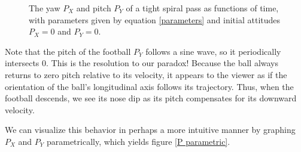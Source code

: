 \documentclass{article}
\begin{document}
\begin{figure}[h]
    \centering
    \caption{The yaw $P_X$ and pitch $P_Y$ of a tight spiral pass as functions of time, with parameters given by equation \ref{parameters} and initial attitudes $P_X = 0$ and $P_Y = 0$.}
    \label{P vs time}
\end{figure}
Note that the pitch of the football $P_Y$ follows a sine wave, so it periodically intersects $0$. This is the resolution to our paradox! Because the ball always returns to zero pitch relative to its velocity, it appears to the viewer as if the orientation of the ball's longitudinal axis follows its trajectory. Thus, when the football descends, we see its nose dip as its pitch compensates for its downward velocity.

We can visualize this behavior in perhaps a more intuitive manner by graphing $P_X$ and $P_Y$ parametrically, which yields figure \ref{P parametric}.
\end{document}
